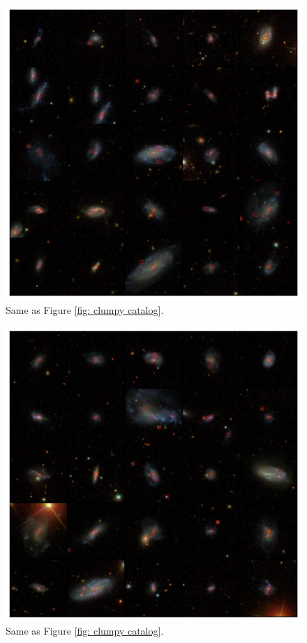 \begin{figure}
\includegraphics[width=\textwidth]{Figures/display_all_clumpy_jpegs_group1.pdf}
\caption[Visual catalog of SDSS Stripe 82 ``clumpy'' galaxies.]{Same as Figure \ref{fig: clumpy catalog}.}
\end{figure}


\begin{figure}
\includegraphics[width=\textwidth]{Figures/display_all_clumpy_jpegs_group2.pdf}
\caption[Visual catalog of SDSS Stripe 82 ``clumpy'' galaxies.]{Same as Figure \ref{fig: clumpy catalog}.}
\end{figure}

